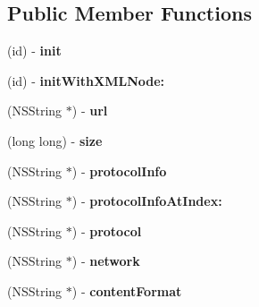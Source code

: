 \subsection*{Public Member Functions}
\begin{DoxyCompactItemize}
\item 
\hypertarget{interface_c_g_upnp_av_resource_a45f9d82ef310eacef4da766d2e5a43f3}{(id) -\/ {\bfseries init}}\label{interface_c_g_upnp_av_resource_a45f9d82ef310eacef4da766d2e5a43f3}

\item 
\hypertarget{interface_c_g_upnp_av_resource_a894c206c9c606393261b270a9b1edb51}{(id) -\/ {\bfseries init\-With\-X\-M\-L\-Node\-:}}\label{interface_c_g_upnp_av_resource_a894c206c9c606393261b270a9b1edb51}

\item 
\hypertarget{interface_c_g_upnp_av_resource_acdf4aea11572ff2fce6618ad39715d48}{(N\-S\-String $\ast$) -\/ {\bfseries url}}\label{interface_c_g_upnp_av_resource_acdf4aea11572ff2fce6618ad39715d48}

\item 
\hypertarget{interface_c_g_upnp_av_resource_a982ed3761f022439dc7435e7ce88aadd}{(long long) -\/ {\bfseries size}}\label{interface_c_g_upnp_av_resource_a982ed3761f022439dc7435e7ce88aadd}

\item 
\hypertarget{interface_c_g_upnp_av_resource_afbb6b60f5df59a3b06192de48628af2a}{(N\-S\-String $\ast$) -\/ {\bfseries protocol\-Info}}\label{interface_c_g_upnp_av_resource_afbb6b60f5df59a3b06192de48628af2a}

\item 
\hypertarget{interface_c_g_upnp_av_resource_aab808d636a4ad8dbc91e82e3c4879f50}{(N\-S\-String $\ast$) -\/ {\bfseries protocol\-Info\-At\-Index\-:}}\label{interface_c_g_upnp_av_resource_aab808d636a4ad8dbc91e82e3c4879f50}

\item 
\hypertarget{interface_c_g_upnp_av_resource_add1cefc3caa21f06c6e584a8eb0086a0}{(N\-S\-String $\ast$) -\/ {\bfseries protocol}}\label{interface_c_g_upnp_av_resource_add1cefc3caa21f06c6e584a8eb0086a0}

\item 
\hypertarget{interface_c_g_upnp_av_resource_a8260c33c27c1f6d68f2a32af3f6078bd}{(N\-S\-String $\ast$) -\/ {\bfseries network}}\label{interface_c_g_upnp_av_resource_a8260c33c27c1f6d68f2a32af3f6078bd}

\item 
\hypertarget{interface_c_g_upnp_av_resource_adb36d910db6d9c530599d93cc39a129a}{(N\-S\-String $\ast$) -\/ {\bfseries content\-Format}}\label{interface_c_g_upnp_av_resource_adb36d910db6d9c530599d93cc39a129a}


\end{DoxyCompactItemize}
